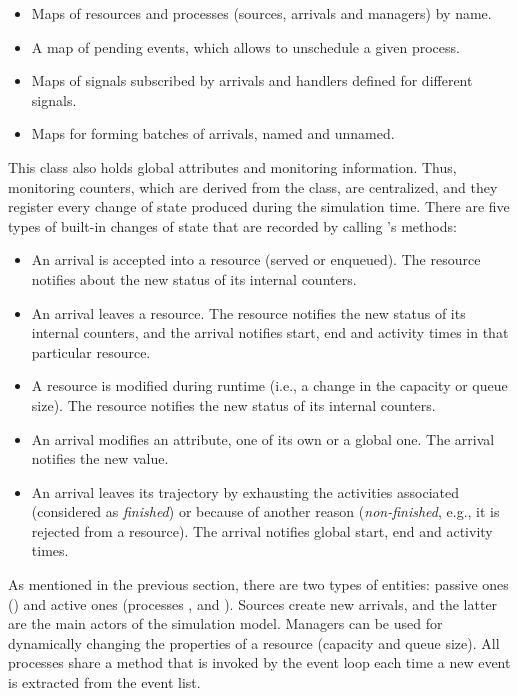\documentclass[
  nojss]{jss}
\providecommand{\tightlist}{%
  \setlength{\itemsep}{0pt}\setlength{\parskip}{0pt}}
\begin{document}
\begin{itemize}
\tightlist
\item
  Maps of resources and processes (sources, arrivals and managers) by
  name.
\item
  A map of pending events, which allows to unschedule a given process.
\item
  Maps of signals subscribed by arrivals and handlers defined for
  different signals.
\item
  Maps for forming batches of arrivals, named and unnamed.
\end{itemize}

This class also holds global attributes and monitoring information.
Thus, monitoring counters, which are derived from the 
class, are centralized, and they register every change of state produced
during the simulation time. There are five types of built-in changes of
state that are recorded by calling 's 
methods:

\begin{itemize}
\tightlist
\item
  An arrival is accepted into a resource (served or enqueued). The
  resource notifies about the new status of its internal counters.
\item
  An arrival leaves a resource. The resource notifies the new status of
  its internal counters, and the arrival notifies start, end and
  activity times in that particular resource.
\item
  A resource is modified during runtime (i.e., a change in the capacity
  or queue size). The resource notifies the new status of its internal
  counters.
\item
  An arrival modifies an attribute, one of its own or a global one. The
  arrival notifies the new value.
\item
  An arrival leaves its trajectory by exhausting the activities
  associated (considered as \emph{finished}) or because of another
  reason (\emph{non-finished}, e.g., it is rejected from a resource).
  The arrival notifies global start, end and activity times.
\end{itemize}

As mentioned in the previous section, there are two types of entities:
passive ones () and active ones (processes ,
 and ). Sources create new arrivals, and the
latter are the main actors of the simulation model. Managers can be used
for dynamically changing the properties of a resource (capacity and
queue size). All processes share a  method that is invoked
by the event loop each time a new event is extracted from the event
list.
\end{document}
